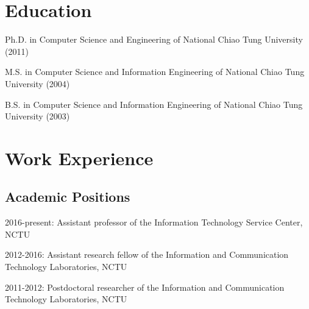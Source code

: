 \documentclass[A4]{article}
\renewenvironment{itemize}{
  \begin{list}{}{
    \setlength{\leftmargin}{1.5em}
  }
}{
  \end{list}
}
\begin{document}
\section*{Education}

\begin{itemize}

  \item Ph.D. in Computer Science and Engineering of National Chiao Tung University (2011)
  \item M.S. in Computer Science and Information Engineering of National Chiao Tung University (2004)
  \item B.S. in Computer Science and Information Engineering of National Chiao Tung University (2003)
 
\end{itemize}

\section*{Work Experience}

\subsection*{Academic Positions}
\begin{itemize}
\item 2016-present: Assistant professor of the Information Technology Service Center, NCTU
\item 2012-2016: Assistant research fellow of the Information and Communication Technology Laboratories, NCTU
\item 2011-2012: Postdoctoral researcher of the Information and Communication Technology Laboratories, NCTU
\end{itemize}
\end{document}
